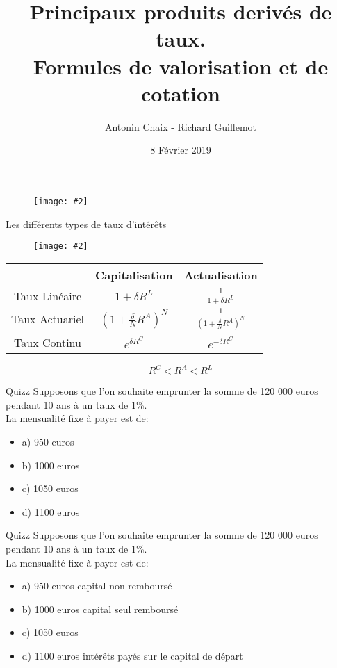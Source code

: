 \documentclass{beamer}
\title[Pdts dérivés de taux]{Principaux produits derivés de taux. \\ Formules de valorisation et de cotation}
\author{Antonin Chaix - Richard Guillemot}
\institute{Master IFMA}
\date{8 Février 2019}
\newcommand{\FIG}[2]{\texttt{[image: \#2]}}
\begin{document}
\begin{frame}
\titlepage
\begin{figure}[h]
\centering \FIG{5cm}{figures/UPMC_IFMA.jpg}
\end{figure}
\end{frame}

\begin{frame}{Les différents types de taux d'intérêts}
\begin{figure}[h]
\centering \FIG{7cm}{figures/capi_actu.png}
\end{figure}
\begin{center}
\begin{tabular}{|c|c|c|}
\hline
&\textbf{C}apitalisation&\textbf{A}ctualisation \\
\hline
  Taux Linéaire & $1+\delta R^L$ &  $\frac{1}{1+\delta R^L}$ \\
  Taux Actuariel & $(1+\frac{\delta}{N}R^A)^N$ &  $\frac{1}{(1+\frac{\delta}{N}R^A)^N}$ \\
  Taux Continu & $e^{\delta R^C}$ & $e^{-\delta R^C}$ \\
\hline
\end{tabular}
\end{center}
\[
	R^C < R^A < R^L
\]
\end{frame}

\begin{frame}{Quizz}
Supposons que l'on souhaite emprunter la somme de 120 000 euros pendant 10 ans à un taux de 1\%.\\

\vspace{0.5cm}
La mensualité fixe à payer est de:
\begin{itemize}
\item a) 950 euros
\item b) 1000 euros
\item c) 1050 euros
\item d) 1100 euros
\end{itemize}

\end{frame}

\begin{frame}{Quizz}
Supposons que l'on souhaite emprunter la somme de 120 000 euros pendant 10 ans à un taux de 1\%.\\

\vspace{0.5cm}
La mensualité fixe à payer est de:
\begin{itemize}
\item a) 950 euros \textbf{\color{red}{FAUX}} capital non remboursé
\item b) 1000 euros \textbf{\color{red}{FAUX}} capital seul remboursé
\item c) 1050 euros \textbf{\color{green}{VRAI}}
\item d) 1100 euros \textbf{\color{red}{VRAI}} intérêts payés sur le capital de départ
\end{itemize}

\end{frame}
\end{document}
